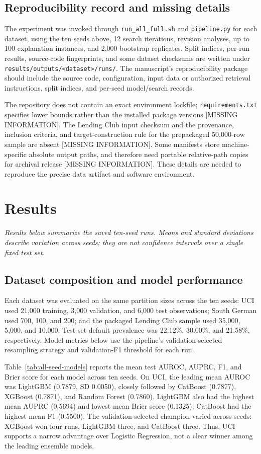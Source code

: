 \documentclass[pdflatex,sn-mathphys-num]{sn-jnl}
\begin{document}
\subsection{Reproducibility record and missing details}
The experiment was invoked through \texttt{run\_all\_full.sh} and \texttt{pipeline.py} for each dataset, using the ten seeds above, 12 search iterations, revision analyses, up to 100 explanation instances, and 2,000 bootstrap replicates. Split indices, per-run results, source-code fingerprints, and some dataset checksums are written under \texttt{results/outputs/<dataset>/runs/}. The manuscript's reproducibility package should include the source code, configuration, input data or authorized retrieval instructions, split indices, and per-seed model/search records.

The repository does not contain an exact environment lockfile; \texttt{requirements.txt} specifies lower bounds rather than the installed package versions [MISSING INFORMATION]. The Lending Club input checksum and the provenance, inclusion criteria, and target-construction rule for the prepackaged 50,000-row sample are absent [MISSING INFORMATION]. Some manifests store machine-specific absolute output paths, and therefore need portable relative-path copies for archival release [MISSING INFORMATION]. These details are needed to reproduce the precise data artifact and software environment.

\section{Results}
\textit{Results below summarize the saved ten-seed runs. Means and standard deviations describe variation across seeds; they are not confidence intervals over a single fixed test set.}

\subsection{Dataset composition and model performance}
Each dataset was evaluated on the same partition sizes across the ten seeds: UCI used 21,000 training, 3,000 validation, and 6,000 test observations; South German used 700, 100, and 200; and the packaged Lending Club sample used 35,000, 5,000, and 10,000. Test-set default prevalence was 22.12\%, 30.00\%, and 21.58\%, respectively. Model metrics below use the pipeline's validation-selected resampling strategy and validation-F1 threshold for each run.

Table~\ref{tab:all-seed-models} reports the mean test AUROC, AUPRC, F1, and Brier score for each model across ten seeds. On UCI, the leading mean AUROC was LightGBM (0.7879, SD 0.0050), closely followed by CatBoost (0.7877), XGBoost (0.7871), and Random Forest (0.7860). LightGBM also had the highest mean AUPRC (0.5694) and lowest mean Brier score (0.1325); CatBoost had the highest mean F1 (0.5500). The validation-selected champion varied across seeds: XGBoost won four runs, LightGBM three, and CatBoost three. Thus, UCI supports a narrow advantage over Logistic Regression, not a clear winner among the leading ensemble models.
\end{document}
